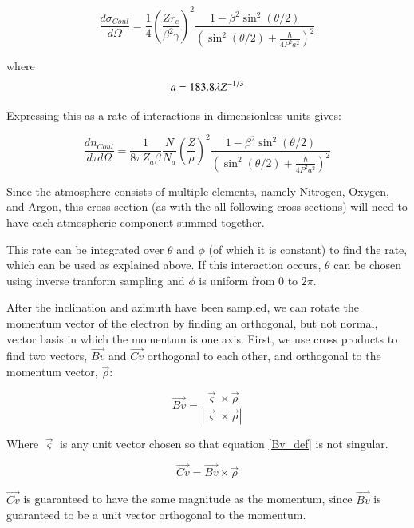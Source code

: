 \documentclass[]{article}
\begin{document}
\begin{equation} 
\frac{d\sigma_{Coul}}{d \Omega} = \frac{1}{4}\left(  \frac{Z r_e }{\beta^2 \gamma }  \right)^2\frac{1-\beta^2\sin^2(\theta/2)}{ \left(  \sin^2(\theta/2) + \frac{\hbar}{4P^2a^2}  \right)^2 }
\end{equation}

where
\begin{equation} 
a=183.8 \lambdabar Z^{-1/3}
\end{equation}

Expressing this as a rate of interactions in dimensionless units gives:

\begin{equation} 
\frac{dn_{Coul}}{d\tau d\Omega} = \frac{1}{8\pi Z_a \beta}  \frac{N}{N_a} \left( \frac{Z }{\rho}  \right)^2\frac{1-\beta^2\sin^2(\theta/2)}{ \left(  \sin^2(\theta/2) + \frac{\hbar}{4P^2a^2}  \right)^2 }
\end{equation}

Since the atmosphere consists of multiple elements,  namely Nitrogen, Oxygen, and Argon, this cross section (as with the all following cross sections) will need to have each atmospheric component summed together.  

This rate can be integrated over $\theta$ and $\phi$ (of which it is constant) to find the rate, which can be used as explained above. If this interaction occurs, $\theta$ can be chosen using inverse tranform sampling and $\phi$ is uniform from 0 to $2\pi$.

After the inclination and azimuth have been sampled, we can rotate the momentum vector of the electron by finding an orthogonal, but not normal, vector basis in which the momentum is one axis. First, we use cross products to find two vectors, $\vec{Bv}$ and $\vec{Cv}$ orthogonal to each other, and orthogonal to the momentum vector, $\vec{\rho}$:

\begin{equation}
\label{Bv_def}
\vec{Bv}=\frac{\vec{\varsigma}\times \vec{\rho}}{ \left| \vec{\varsigma}\times \vec{\rho}  \right|   }
\end{equation}

Where $\vec{\varsigma}$ is any unit vector chosen so that equation \ref{Bv_def} is not singular.

\begin{equation}
\vec{Cv}=\vec{Bv}\times \vec{\rho}
\end{equation}

$\vec{Cv}$ is guaranteed to have the same magnitude as the momentum, since $\vec{Bv}$ is guaranteed to be a unit vector orthogonal to the momentum.
\end{document}
